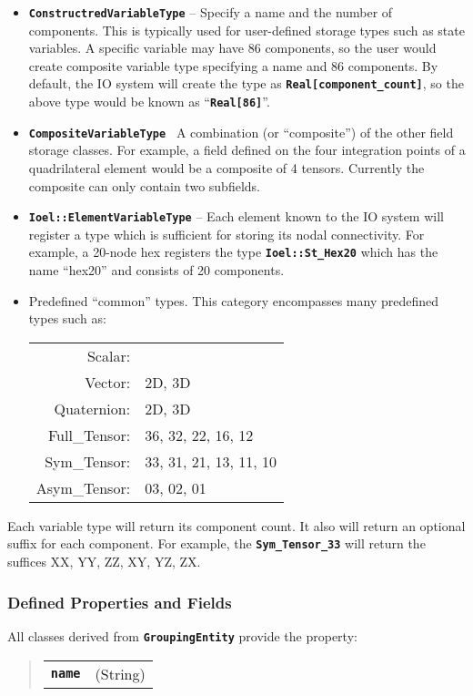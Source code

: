 \documentclass[11pt,twoside]{article}
\newcommand{\code}[1]
   {\mbox{\bf\tt #1}\null}
\begin{document}
\begin{itemize}
\item {
\code{ConstructredVariableType} -- Specify a name and the
number of components. This is typically used for user{}-defined storage
types such as state variables. A specific variable may have 86
components, so the user would create composite variable type specifying
a name and 86 components. By default, the IO system will create the
type as \code{Real[component\_count]}, so the above type
would be known as ``\code{Real[86]}''.}
\item {
\code{CompositeVariableType }{--} A combination (or
``composite'') of the other field storage classes. For example, a
field defined on the four integration points of a quadrilateral element
would be a composite of 4 tensors. Currently the composite can only
contain two subfields.}
\item {
\code{Ioel::ElementVariableType} -- Each element known to
the IO system will register a type which is sufficient for storing its
nodal connectivity. For example, a 20{}-node hex registers the type
\code{Ioel::St\_Hex20} which has the name ``hex20'' and
consists of 20 components.}
\item {
Predefined ``common'' types. This category encompasses many predefined
types such as:}
\begin{tabular}{rl}
Scalar:      & \\
Vector:      & 2D, 3D \\
Quaternion:  & 2D, 3D \\
Full\_Tensor:& 36, 32, 22, 16, 12 \\
Sym\_Tensor: & 33, 31, 21, 13, 11, 10 \\
Asym\_Tensor:& 03, 02, 01 \\
\end{tabular}
\end{itemize}
Each variable type will return its component count. It also will return
an optional suffix for each component. For example, the
\code{Sym\_Tensor\_33} will return the suffices XX, YY, ZZ,
XY, YZ, ZX.

\subsubsection{Defined Properties and Fields}

All classes derived from \code{GroupingEntity} provide the property:
\begin{quote}
\begin{tabular}{ll}
\code{name}                  &(String)  \\
\end{tabular}
\end{quote}
\end{document}
